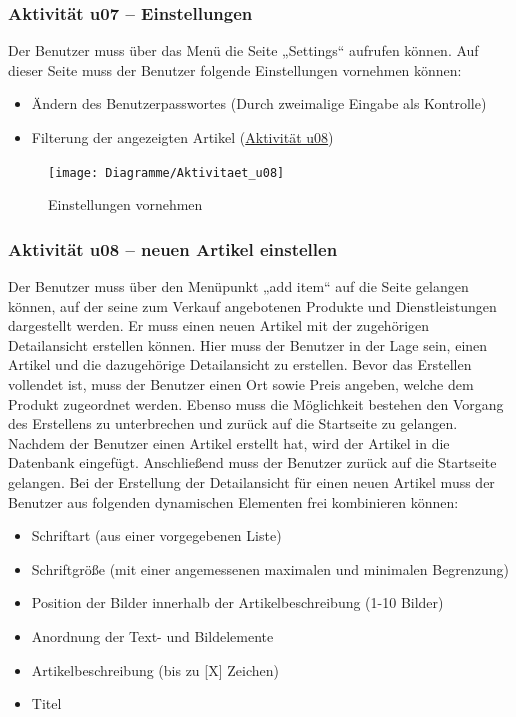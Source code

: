 \documentclass[a4paper,12pt,oneside]{scrartcl}
\begin{document}
\subsubsection{Aktivität u07 – Einstellungen}
Der Benutzer muss über das Menü die Seite „Settings“ aufrufen können. Auf dieser Seite muss der Benutzer folgende Einstellungen vornehmen können:
\begin{itemize}
	\item Ändern des Benutzerpasswortes (Durch zweimalige Eingabe als Kontrolle)
	\item Filterung der angezeigten Artikel (\hyperlink{u08}{Aktivität u08})
\end{itemize}

\begin{figure}[!htbp]
\centering
\noindent\texttt{[image: Diagramme/Aktivitaet\_u08]}
\caption{Einstellungen vornehmen}
\end{figure}
\FloatBarrier


\hypertarget{u08}{\subsubsection{Aktivität u08 – neuen Artikel einstellen}}
Der Benutzer muss über den Menüpunkt „add item“ auf die Seite gelangen können, auf der seine zum Verkauf angebotenen Produkte und Dienstleistungen dargestellt werden. Er muss einen neuen Artikel mit der  zugehörigen Detailansicht erstellen können. Hier muss der Benutzer in der Lage sein, einen Artikel und die dazugehörige Detailansicht zu erstellen. Bevor das Erstellen vollendet ist, muss der Benutzer einen Ort sowie Preis angeben, welche dem Produkt zugeordnet werden. Ebenso muss die Möglichkeit bestehen den Vorgang des Erstellens zu unterbrechen und zurück auf die Startseite zu gelangen. Nachdem der Benutzer einen Artikel erstellt hat, wird der Artikel in die Datenbank eingefügt. Anschließend muss der Benutzer zurück auf die Startseite gelangen. 
Bei der Erstellung der Detailansicht für einen neuen Artikel muss der Benutzer aus folgenden dynamischen Elementen frei kombinieren können:
\begin{itemize}
	\item Schriftart (aus einer vorgegebenen Liste)
	\item Schriftgröße (mit einer angemessenen maximalen und minimalen Begrenzung)
	\item Position der Bilder innerhalb der Artikelbeschreibung (1-10 Bilder)
	\item Anordnung der Text- und Bildelemente
	\item Artikelbeschreibung (bis zu [X] Zeichen)
	\item Titel
\end{itemize}
\end{document}
